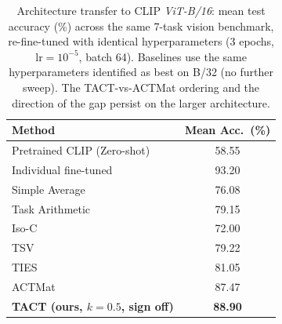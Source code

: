 \begin{table}[t]
\caption{Architecture transfer to CLIP \emph{ViT-B/16}: mean test accuracy (\%) across the same 7-task vision benchmark, re-fine-tuned with identical hyperparameters (3 epochs, $\mathrm{lr}{=}10^{-5}$, batch 64). Baselines use the same hyperparameters identified as best on B/32 (no further sweep). The TACT-vs-ACTMat ordering and the direction of the gap persist on the larger architecture.}
\label{tab:b16}
\centering
\small
\begin{tabular}{lc}
\toprule
Method & Mean Acc.~(\%) \\
\midrule
Pretrained CLIP (Zero-shot)  & 58.55 \\
Individual fine-tuned        & 93.20 \\
\midrule
Simple Average               & 76.08 \\
Task Arithmetic              & 79.15 \\
Iso-C                        & 72.00 \\
TSV                          & 79.22 \\
TIES                         & 81.05 \\
ACTMat                       & 87.47 \\
\textbf{TACT (ours, $k{=}0.5$, sign off)} & \textbf{88.90} \\
\bottomrule
\end{tabular}
\end{table}
